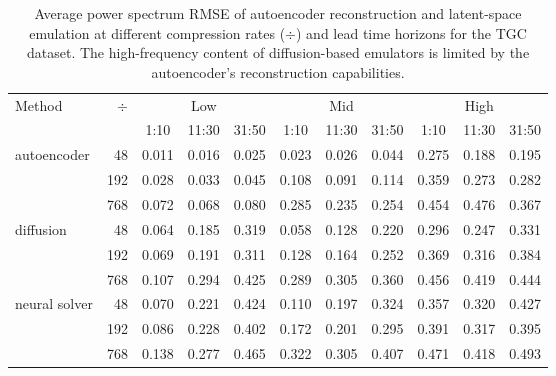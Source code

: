 \begin{subappendices}
\begin{table}[h]
    \centering
    \caption{Average power spectrum RMSE of autoencoder reconstruction and latent-space emulation at different compression rates ($\div$) and lead time horizons for the TGC dataset. The high-frequency content of diffusion-based emulators is limited by the autoencoder's reconstruction capabilities.}
    \footnotesize
    \begin{tabular}{lrccccccccc}
        \toprule
        \multirow[c]{2}{*}{Method} & \multirow[c]{2}{*}{$\div$ \hspace{0.1em}} & \multicolumn{3}{c}{Low} & \multicolumn{3}{c}{Mid} & \multicolumn{3}{c}{High} \\
        \cmidrule(lr){3-5} \cmidrule(lr){6-8} \cmidrule(lr){9-11}
        & & 1:10 & 11:30 & 31:50 & 1:10 & 11:30 & 31:50 & 1:10 & 11:30 & 31:50 \\
        \midrule
        \multirow[c]{3}{*}{autoencoder}
        & 48 & 0.011 & 0.016 & 0.025 & 0.023 & 0.026 & 0.044 & 0.275 & 0.188 & 0.195 \\
        & 192 & 0.028 & 0.033 & 0.045 & 0.108 & 0.091 & 0.114 & 0.359 & 0.273 & 0.282 \\
        & 768 & 0.072 & 0.068 & 0.080 & 0.285 & 0.235 & 0.254 & 0.454 & 0.476 & 0.367 \\
        \midrule
        \multirow[c]{3}{*}{diffusion}
        & 48 & 0.064 & 0.185 & 0.319 & 0.058 & 0.128 & 0.220 & 0.296 & 0.247 & 0.331 \\
        & 192 & 0.069 & 0.191 & 0.311 & 0.128 & 0.164 & 0.252 & 0.369 & 0.316 & 0.384 \\
        & 768 & 0.107 & 0.294 & 0.425 & 0.289 & 0.305 & 0.360 & 0.456 & 0.419 & 0.444 \\
        \midrule
        \multirow[c]{3}{*}{neural solver}
        & 48 & 0.070 & 0.221 & 0.424 & 0.110 & 0.197 & 0.324 & 0.357 & 0.320 & 0.427 \\
        & 192 & 0.086 & 0.228 & 0.402 & 0.172 & 0.201 & 0.295 & 0.391 & 0.317 & 0.395 \\
        & 768 & 0.138 & 0.277 & 0.465 & 0.322 & 0.305 & 0.407 & 0.471 & 0.418 & 0.493 \\
        \bottomrule
    \end{tabular}
    \label{tab:tgc-power-rmse}
\end{table}


\end{subappendices}
